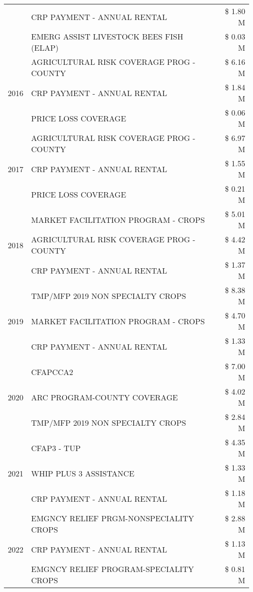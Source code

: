 \begin{tabular}{llr}
 & CRP PAYMENT - ANNUAL RENTAL & \$ 1.80 M \\
 & EMERG ASSIST LIVESTOCK BEES FISH (ELAP) & \$ 0.03 M \\
\cline{1-3}
\multirow[t]{3}{*}{2016} & AGRICULTURAL RISK COVERAGE PROG - COUNTY & \$ 6.16 M \\
 & CRP PAYMENT - ANNUAL RENTAL & \$ 1.84 M \\
 & PRICE LOSS COVERAGE & \$ 0.06 M \\
\cline{1-3}
\multirow[t]{3}{*}{2017} & AGRICULTURAL RISK COVERAGE PROG - COUNTY & \$ 6.97 M \\
 & CRP PAYMENT - ANNUAL RENTAL & \$ 1.55 M \\
 & PRICE LOSS COVERAGE & \$ 0.21 M \\
\cline{1-3}
\multirow[t]{3}{*}{2018} & MARKET FACILITATION PROGRAM - CROPS & \$ 5.01 M \\
 & AGRICULTURAL RISK COVERAGE PROG - COUNTY & \$ 4.42 M \\
 & CRP PAYMENT - ANNUAL RENTAL & \$ 1.37 M \\
\cline{1-3}
\multirow[t]{3}{*}{2019} & TMP/MFP 2019 NON SPECIALTY CROPS & \$ 8.38 M \\
 & MARKET FACILITATION PROGRAM - CROPS & \$ 4.70 M \\
 & CRP PAYMENT - ANNUAL RENTAL & \$ 1.33 M \\
\cline{1-3}
\multirow[t]{3}{*}{2020} & CFAPCCA2 & \$ 7.00 M \\
 & ARC PROGRAM-COUNTY COVERAGE & \$ 4.02 M \\
 & TMP/MFP 2019 NON SPECIALTY CROPS & \$ 2.84 M \\
\cline{1-3}
\multirow[t]{3}{*}{2021} & CFAP3 - TUP & \$ 4.35 M \\
 & WHIP PLUS 3 ASSISTANCE & \$ 1.33 M \\
 & CRP PAYMENT - ANNUAL RENTAL & \$ 1.18 M \\
\cline{1-3}
\multirow[t]{3}{*}{2022} & EMGNCY RELIEF PRGM-NONSPECIALITY CROPS & \$ 2.88 M \\
 & CRP PAYMENT - ANNUAL RENTAL & \$ 1.13 M \\
 & EMGNCY RELIEF PROGRAM-SPECIALITY CROPS & \$ 0.81 M \\
\cline{1-3}
\bottomrule
\end{tabular}
